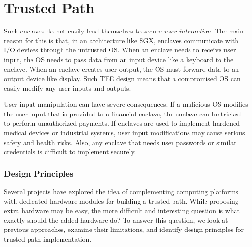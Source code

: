 
\section*{Trusted Path}

 Such enclaves do not easily lend themselves to secure \emph{user interaction}. The main reason for this is that, in an architecture like SGX, enclaves communicate with I/O devices through the untrusted OS. When an enclave needs to receive user input, the OS needs to pass data from an input device like a keyboard to the enclave. When an enclave creates user output, the OS must forward data to an output device like display. Such TEE design means that a compromised OS can easily modify any user inputs and outputs.

User input manipulation can have severe consequences. If a malicious OS modifies the user input that is provided to a financial enclave, the enclave can be tricked to perform unauthorized payments. If enclaves are used to implement hardened medical devices or industrial systems, user input modifications may cause serious safety and health risks. Also, any enclave that needs user passwords or similar credentials is difficult to implement securely.




\subsubsection*{Design Principles}

Several projects have explored the idea of complementing computing platforms with dedicated hardware modules for building a trusted path. While proposing extra hardware may be easy, the more difficult and interesting question is what exactly should the added hardware do? To answer this question, we look at previous approaches, examine their limitations, and identify design principles for trusted path implementation.
    
